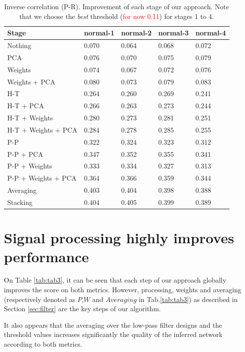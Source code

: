 \documentclass[wcp]{jmlr}
\begin{document}
\begin{table}[htb]
\centering
\caption{Inverse correlation (P-R). Improvement of each stage of our approach. Note that we choose the
         \textit{best} threshold (\textcolor{red}{for now 0.11}) for stages 1 to 4.}
\begin{tabular}{*{5}{l}}
\toprule
Stage               & normal-1 & normal-2 & normal-3 & normal-4 \\
\midrule
Nothing             & 0.070 & 0.064 & 0.068 & 0.072\\
PCA                 & 0.076 & 0.070 & 0.075 & 0.079\\
Weights             & 0.074 & 0.067 & 0.072 & 0.076\\
Weights + PCA       & 0.080 & 0.073 & 0.079 & 0.083\\
H-T                 & 0.264 & 0.260 & 0.269 & 0.241\\
H-T + PCA           & 0.266 & 0.263 & 0.273 & 0.244\\
H-T + Weights       & 0.280 & 0.273 & 0.281 & 0.251\\
H-T + Weights + PCA & 0.284 & 0.278 & 0.285 & 0.255\\
P-P                 & 0.322 & 0.324 & 0.323 & 0.312\\
P-P + PCA           & 0.347 & 0.352 & 0.355 & 0.341\\
P-P + Weights       & 0.333 & 0.334 & 0.327 & 0.313\\
P-P + Weights + PCA & 0.364 & 0.366 & 0.359 & 0.344\\
Averaging           & 0.403 & 0.404 & 0.398 & 0.388\\
Stacking            & 0.404 & 0.405 & 0.399 & 0.389\\
\bottomrule
\end{tabular}
\end{table}


\section{Signal processing highly improves performance}


On Table \ref{tab:tab3}, it can be seen that each step of our approach globally
improves the score on both metrics. However, processing, weights and averaging
(respectively denoted as $P$,$W$ and $Averaging$ in Tab.\ref{tab:tab3}) as
described in Section \ref{sec:filter} are the key steps of our algorithm.

It also appears that the averaging over the low-pass filter designs and the
threshold values increases significantly the quality of the inferred network
according to both metrics.
\end{document}
